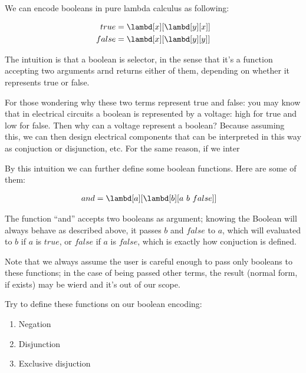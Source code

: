 \documentclass[../../../include/open-logic-section]{subfiles}
\begin{document}

We can encode booleans in pure lambda calculus as following:

\begin{align*}
  {true} &= \lambd[x][\lambd[y][x]]\\
  {false} &= \lambd[x][\lambd[y][y]]
\end{align*}

The intuition is that a boolean is selector, in the sense that it's a function accepting two arguments
arnd returns either of them, depending on whether it represents true or
false.

\begin{explain}
  For those wondering why these two terms represent true and false:
  you may know that in electrical circuits a boolean is represented by
  a voltage: high for true and low for false. Then why can a voltage
  represent a boolean? Because assuming this, we can then design
  electrical components that can be interpreted in this way as conjuction or
  disjunction, etc. For the same reason, if we inter
\end{explain}


By this intuition we can further define some boolean functions. Here
are some of them:

\begin{align*}
  {and} &= \lambd[a][\lambd[b][a ~ b ~ {false}]]
\end{align*}

The function ``and'' accepts two booleans as argument; knowing the
Boolean will always behave as described above, it passes $b$ and ${false}$
to $a$, which will evaluated to $b$ if $a$ is ${true}$, or ${false}$ if $a$ is ${false}$,
which is exactly how conjuction is defined.

Note that we always assume the user is careful enough to pass only booleans to these functions; in the
case of being passed other terms, the result (normal form, if exists) may be wierd and it's
out of our scope.

\begin{prob}
  Try to define these functions on our boolean encoding:
  \begin{enumerate}
  \item Negation
  \item Disjunction
  \item Exclusive disjuction
  \end{enumerate}
\end{prob}
\end{document}
